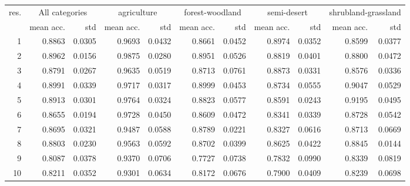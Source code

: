\begin{tabular}{rrrrrrrrrrr}
\toprule
res. & \multicolumn{2}{c}{All categories} & \multicolumn{2}{c}{agriculture} & \multicolumn{2}{c}{forest-woodland} & \multicolumn{2}{c}{semi-desert} & \multicolumn{2}{c}{shrubland-grassland} \\
           &     mean acc. &    std &                 mean acc. &    std &                     mean acc. &    std &                 mean acc. &    std &                         mean acc. &    std \\
\midrule
         1 &   0.8863 & 0.0305 &               0.9693 & 0.0432 &                   0.8661 & 0.0452 &               0.8974 & 0.0352 &                       0.8599 & 0.0377 \\
         2 &   0.8962 & 0.0156 &               0.9875 & 0.0280 &                   0.8951 & 0.0526 &               0.8819 & 0.0401 &                       0.8800 & 0.0472 \\
         3 &   0.8791 & 0.0267 &               0.9635 & 0.0519 &                   0.8713 & 0.0761 &               0.8873 & 0.0331 &                       0.8576 & 0.0336 \\
         4 &   0.8991 & 0.0339 &               0.9717 & 0.0317 &                   0.8999 & 0.0453 &               0.8734 & 0.0555 &                       0.9047 & 0.0529 \\
         5 &   0.8913 & 0.0301 &               0.9764 & 0.0324 &                   0.8823 & 0.0577 &               0.8591 & 0.0243 &                       0.9195 & 0.0495 \\
         6 &   0.8655 & 0.0194 &               0.9728 & 0.0450 &                   0.8609 & 0.0472 &               0.8341 & 0.0339 &                       0.8728 & 0.0542 \\
         7 &   0.8695 & 0.0321 &               0.9487 & 0.0588 &                   0.8789 & 0.0221 &               0.8327 & 0.0616 &                       0.8713 & 0.0669 \\
         8 &   0.8803 & 0.0230 &               0.9563 & 0.0592 &                   0.8702 & 0.0399 &               0.8625 & 0.0422 &                       0.8845 & 0.0144 \\
         9 &   0.8087 & 0.0378 &               0.9370 & 0.0706 &                   0.7727 & 0.0738 &               0.7832 & 0.0990 &                       0.8339 & 0.0819 \\
        10 &   0.8211 & 0.0352 &               0.9301 & 0.0634 &                   0.8172 & 0.0676 &               0.7900 & 0.0409 &                       0.8239 & 0.0698 \\

\end{tabular}
